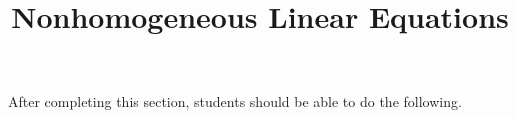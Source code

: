 \documentclass{ximera}
\title{Nonhomogeneous Linear Equations}
\begin{document}
\begin{abstract}
\end{abstract}

\maketitle

\begin{sectionOutcomes}

After completing this section, students should be able to do the following.

\begin{itemize}
	
\end{itemize}

\end{sectionOutcomes}
\end{document}
